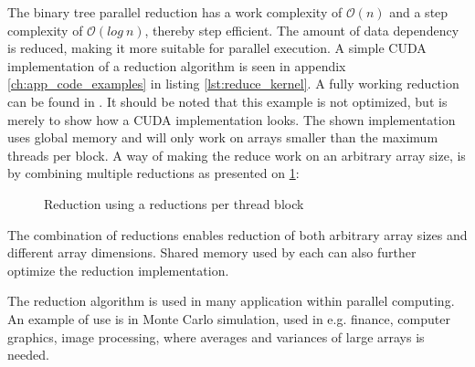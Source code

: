 The binary tree parallel reduction has a work complexity of $\mathcal{O}(n)$ and a step complexity of $\mathcal{O}(log ~ n)$, thereby step efficient. 
The amount of data dependency is reduced, making it more suitable for parallel execution. A simple CUDA implementation of a reduction algorithm is seen in appendix \cref{ch:app_code_examples} in listing \ref{lst:reduce_kernel}. A fully working reduction can be found in \cite{exercises}. It should be noted that this example is not optimized, but is merely to show how a CUDA implementation looks. The shown implementation uses global memory and will only work on arrays smaller than the maximum threads per block. A way of making the reduce work on an arbitrary array size, is by combining multiple reductions as presented on \cref{fig:al_reduce_combine}:

\begin{figure}[ht]
	\centering
	\caption{Reduction using a reductions per thread block}
	\label{fig:al_reduce_combine}
\end{figure}

The combination of reductions enables reduction of both arbitrary array sizes and different array dimensions. Shared memory used by each  can also further optimize the reduction implementation.

The reduction algorithm is used in many application within parallel computing. An example of use is in Monte Carlo simulation, used in e.g. finance, computer graphics, image processing, where averages and variances of large arrays is needed.
